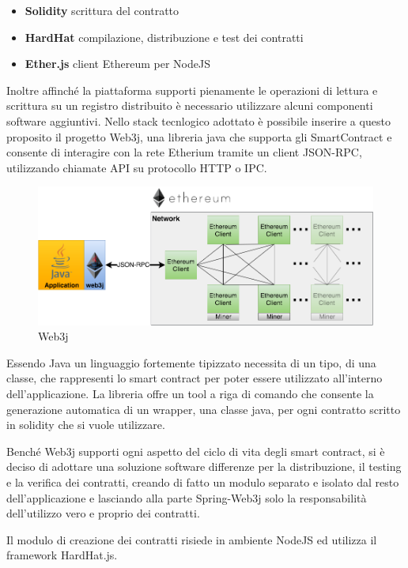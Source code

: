 \documentclass[a4paper,11pt]{article}
\begin{document}
\begin{itemize}
  \item \textbf{Solidity} scrittura del contratto
  \item \textbf{HardHat} compilazione, distribuzione e test dei contratti
  \item \textbf{Ether.js} client Ethereum per NodeJS
\end{itemize}

Inoltre affinché la piattaforma supporti pienamente le operazioni di lettura e scrittura su un registro distribuito è necessario utilizzare alcuni componenti software aggiuntivi. Nello stack tecnlogico adottato è possibile inserire a questo proposito il progetto Web3j, una libreria java che supporta gli SmartContract e consente di interagire con la rete Etherium tramite un client JSON-RPC, utilizzando chiamate API su protocollo HTTP o IPC. \cite{web3jQuickstartWeb3j}

\begin{figure}[H]
  \includegraphics[width=1\linewidth]{img/image-2.png}
  \caption{Web3j \cite{web3jQuickstartWeb3j}}
  \label{fig:web3j}
\end{figure}

Essendo Java un linguaggio fortemente tipizzato necessita di un tipo, di una classe, che rappresenti lo smart contract per poter essere utilizzato all'interno dell'applicazione. La libreria offre un tool a riga di comando che consente la generazione automatica di un wrapper, una classe java, per ogni contratto scritto in solidity che si vuole utilizzare.

Benché Web3j supporti ogni aspetto del ciclo di vita degli smart contract, si è deciso di adottare una soluzione software differenze per la distribuzione, il testing e la verifica dei contratti, creando di fatto un modulo separato e isolato dal resto dell'applicazione e lasciando alla parte Spring-Web3j solo la responsabilità dell'utilizzo vero e proprio dei contratti.

Il modulo di creazione dei contratti risiede in ambiente NodeJS ed utilizza il framework HardHat.js.
\end{document}
